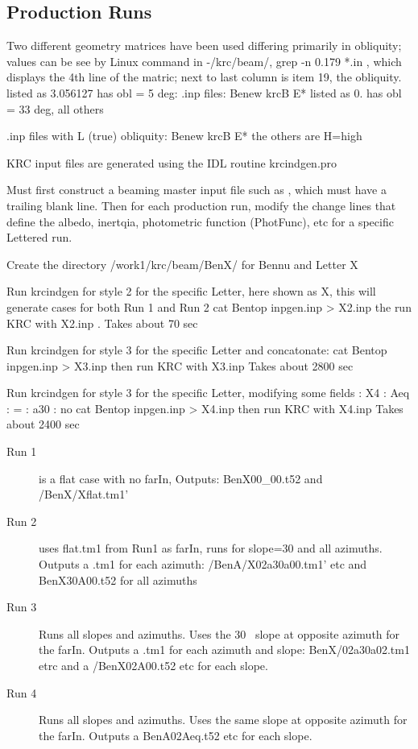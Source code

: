 \documentclass{article}
\begin{document}
\subsection{Production Runs}  %
Two different geometry matrices have been used differing primarily in obliquity; values can be see by Linux command in -/krc/beam/,   grep -n 0.179 *.in , which displays the 4th line of the matric; next to last column is item 19, the obliquity. 
\qi listed as 3.056127 has obl = 5 deg: .inp files: Benew  krcB  E*
\qi listed as 0. has obl = 33 deg, all others

.inp files with L (true) obliquity: Benew  krcB  E*
\qi the others are H=high 

KRC input files are generated using the IDL routine  krcindgen.pro

Must first construct a beaming master input file such as , which must
have a trailing blank line. Then for each production run, modify the change
lines that define the albedo, inertqia, photometric function (PhotFunc), etc for
a specific Lettered run.

Create the directory   /work1/krc/beam/BenX/ for Bennu and Letter X

Run krcindgen for style 2 for the specific Letter, here shown as X, this will generate cases for both Run 1 and Run 2
\qi cat Bentop  inpgen.inp > X2.inp
\qi the run KRC with X2.inp . Takes about 70 sec

Run krcindgen for style 3 for the specific Letter and concatonate:
\qi cat Bentop  inpgen.inp > X3.inp
\qi then run KRC with X3.inp  Takes about 2800 sec

Run krcindgen for style 3 for the specific Letter, modifying some fields
: X4
: Aeq
: = 
: a30
: no
\qi  cat Bentop  inpgen.inp > X4.inp
\qi then run KRC with X4.inp  Takes about 2400 sec

\begin{description}  %
 \item [Run 1] is a flat case with no farIn, Outputs:  BenX00_00.t52 and /BenX/Xflat.tm1'
 \item [Run 2] uses flat.tm1 from Run1 as farIn, runs for slope=30 and all azimuths. 
Outputs a .tm1 for each azimuth: /BenA/X02a30a00.tm1' etc and BenX30A00.t52
for all azimuths

 \item [Run 3] Runs all slopes and azimuths. Uses the 30\qd~ slope at opposite
   azimuth for the farIn. Outputs a .tm1 for each azimuth and slope:
   BenX/02a30a02.tm1 etrc and a /BenX02A00.t52 etc for each slope.

 \item [Run 4] Runs all slopes and azimuths. Uses the same slope at opposite
   azimuth for the farIn.  Outputs a BenA02Aeq.t52 etc for each slope.
 \end{description}
\end{document}
